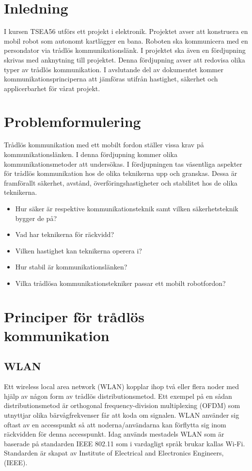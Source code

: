 \documentclass[a4paper,12pt,fleqn]{article}
\begin{document}
\addto\captionsswedish{\renewcommand{\contentsname}{Innehållsförteckning}}

\tableofcontents
\thispagestyle{fancy}
\newpage

\section{Inledning}
I kursen TSEA56 utförs ett projekt i elektronik. Projektet avser att konstruera en mobil robot som autonomt kartlägger en bana. Roboten ska kommunicera med en persondator via trådlös kommunikationslänk. I projektet ska även en fördjupning skrivas med anknytning till projektet. Denna fördjupning avser att redovisa olika typer av trådlös kommunikation. I avslutande del av dokumentet kommer kommunikationsprinciperna att jämföras utifrån hastighet, säkerhet och applicerbarhet för vårat projekt. 

\section{Problemformulering}
Trådlös kommunikation med ett mobilt fordon ställer vissa krav på kommunikationslänken. I denna fördjupning kommer olika kommunikationsmetoder att undersökas. I fördjupningen tas väsentliga aspekter för trådlös kommunikation hos de olika teknikerna upp och granskas. Dessa är framförallt säkerhet, avstånd, överföringshastigheter och stabilitet hos de olika teknikerna. 
\begin{itemize}
\item Hur säker är respektive kommunikationsteknik samt vilken säkerhetsteknik bygger de på?
\item Vad har teknikerna för räckvidd?
\item Vilken hastighet kan teknikerna operera i?
\item Hur stabil är kommunikationslänken?
\item Vilka trådlösa kommunikationstekniker passar ett mobilt robotfordon?
\end{itemize}
\newpage

\section{Principer för trådlös kommunikation}
\subsection{WLAN}
Ett wireless local area network (WLAN) kopplar ihop två eller flera noder med hjälp av någon form av trådlös distributionsmetod. Ett exempel på en sådan distributionsmetod är orthogonal frequency-division multiplexing (OFDM) som utnyttjar olika bärvågfrekvenser får att koda om signalen. WLAN använder sig oftast av en accesspunkt så att noderna/användarna kan förflytta sig inom räckvidden för denna accesspunkt. Idag används mestadels WLAN som är baserade på standarden IEEE 802.11 som i vardagligt språk brukar kallas Wi-Fi. Standarden är skapat av Institute of Electrical and Electronics Engineers, (IEEE).
\end{document}
